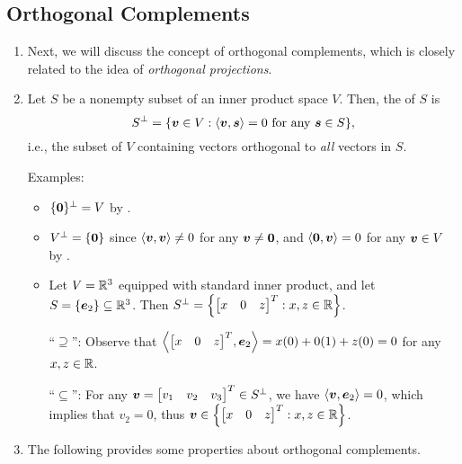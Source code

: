 \subsection{Orthogonal Complements}
\begin{enumerate}
\item Next, we will discuss the concept of orthogonal complements, which is
closely related to the idea of \emph{orthogonal projections}.
\item \label{it:orthog-comp-eg} Let \(S\) be a nonempty subset of an inner
product space \(V\). Then, the  of \(S\) is
\[
S^{\perp}=\{\vb*{v}\in V:\left\langle \vb*{v},\vb*{s}\right\rangle=0\text{ for any }\vb*{s}\in S\},
\]
i.e., the subset of \(V\) containing vectors orthogonal to \emph{all} vectors
in \(S\).

Examples:
\begin{itemize}
\item \(\{\vb*{0}\}^{\perp}=V\) by .
\item \(V^{\perp}=\{\vb*{0}\}\) since \(\left\langle \vb*{v},\vb*{v}\right\rangle\ne 0\) for
any \(\vb*{v}\ne\vb*{0}\), and \(\left\langle \vb*{0},\vb*{v}\right\rangle=0\) for any
\(\vb*{v}\in V\) by .
\item Let \(V=\mathbb{R}^3\) equipped with standard inner product, and let
\(S=\{\vb*{e}_2\}\subseteq \mathbb{R}^3\). Then
\(S^{\perp}=\qty{\mqty[x&0&z]^{T}:x,z\in\R}\).


\begin{pf}
``\(\supseteq\)'': Observe that
\(\inner{\mqty[x&0&z]^{T}}{\vect{e}_2}=x(0)+0(1)+z(0)=0\) for any \(x,z\in\mathbb{R}\).

``\(\subseteq\)'': For any \(\vect{v}=\mqty[v_1&v_2&v_3]^{T}\in S^{\perp}\), we
have \(\left\langle \vb*{v},\vb*{e}_2\right\rangle=0\), which implies that \(v_2=0\), thus
\(\vect{v}\in \qty{\mqty[x&0&z]^{T}:x,z\in\R}\).
\end{pf}
\end{itemize}
\item The following provides some properties about orthogonal complements.


\end{enumerate}
